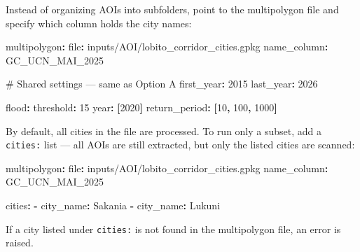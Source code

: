 \documentclass[
  letterpaper,
  DIV=11,
  numbers=noendperiod]{scrreprt}
\newenvironment{Shaded}{\begin{snugshade}}{\end{snugshade}}
\newcommand{\AttributeTok}[1]{\textcolor[rgb]{0.40,0.45,0.13}{#1}}
\newcommand{\CommentTok}[1]{\textcolor[rgb]{0.37,0.37,0.37}{#1}}
\newcommand{\DecValTok}[1]{\textcolor[rgb]{0.68,0.00,0.00}{#1}}
\newcommand{\FunctionTok}[1]{\textcolor[rgb]{0.28,0.35,0.67}{#1}}
\newcommand{\KeywordTok}[1]{\textcolor[rgb]{0.00,0.23,0.31}{\textbf{#1}}}
\begin{document}
Instead of organizing AOIs into subfolders, point to the multipolygon
file and specify which column holds the city names:

\begin{Shaded}
\begin{Highlighting}[]
\FunctionTok{multipolygon}\KeywordTok{:}
\AttributeTok{  }\FunctionTok{file}\KeywordTok{:}\AttributeTok{ inputs/AOI/lobito\_corridor\_cities.gpkg}
\AttributeTok{  }\FunctionTok{name\_column}\KeywordTok{:}\AttributeTok{ GC\_UCN\_MAI\_2025}

\CommentTok{\# Shared settings — same as Option A}
\FunctionTok{first\_year}\KeywordTok{:}\AttributeTok{ }\DecValTok{2015}
\FunctionTok{last\_year}\KeywordTok{:}\AttributeTok{ }\DecValTok{2026}

\FunctionTok{flood}\KeywordTok{:}
\AttributeTok{  }\FunctionTok{threshold}\KeywordTok{:}\AttributeTok{ }\DecValTok{15}
\AttributeTok{  }\FunctionTok{year}\KeywordTok{:}\AttributeTok{ }\KeywordTok{[}\DecValTok{2020}\KeywordTok{]}
\AttributeTok{  }\FunctionTok{return\_period}\KeywordTok{:}\AttributeTok{ }\KeywordTok{[}\DecValTok{10}\KeywordTok{,}\AttributeTok{ }\DecValTok{100}\KeywordTok{,}\AttributeTok{ }\DecValTok{1000}\KeywordTok{]}
\end{Highlighting}
\end{Shaded}

By default, all cities in the file are processed. To run only a subset,
add a \texttt{cities:} list --- all AOIs are still extracted, but only
the listed cities are scanned:

\begin{Shaded}
\begin{Highlighting}[]
\FunctionTok{multipolygon}\KeywordTok{:}
\AttributeTok{  }\FunctionTok{file}\KeywordTok{:}\AttributeTok{ inputs/AOI/lobito\_corridor\_cities.gpkg}
\AttributeTok{  }\FunctionTok{name\_column}\KeywordTok{:}\AttributeTok{ GC\_UCN\_MAI\_2025}

\FunctionTok{cities}\KeywordTok{:}
\AttributeTok{  }\KeywordTok{{-}}\AttributeTok{ }\FunctionTok{city\_name}\KeywordTok{:}\AttributeTok{ Sakania}
\AttributeTok{  }\KeywordTok{{-}}\AttributeTok{ }\FunctionTok{city\_name}\KeywordTok{:}\AttributeTok{ Lukuni}
\end{Highlighting}
\end{Shaded}

\begin{tcolorbox}[enhanced jigsaw, arc=.35mm, bottomrule=.15mm, bottomtitle=1mm, breakable, colback=white, colbacktitle=quarto-callout-note-color!10!white, colframe=quarto-callout-note-color-frame, coltitle=black, left=2mm, leftrule=.75mm, opacityback=0, opacitybacktitle=0.6, rightrule=.15mm, title=\textcolor{quarto-callout-note-color}{\faInfo}\hspace{0.5em}{Note}, titlerule=0mm, toprule=.15mm, toptitle=1mm]

If a city listed under \texttt{cities:} is not found in the multipolygon
file, an error is raised.

\end{tcolorbox}
\end{document}
